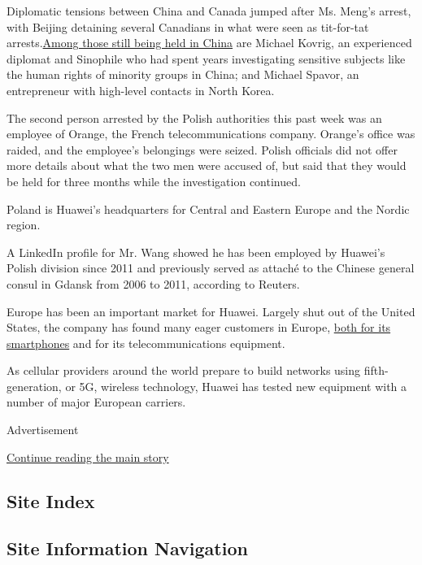 Diplomatic tensions between China and Canada jumped after Ms. Meng's
arrest, with Beijing detaining several Canadians in what were seen as
tit-for-tat
arrests.\href{https://www.nytimes.com/2018/12/14/world/canada/china-detained-spavor-kovrig.html}{Among
those still being held in China} are Michael Kovrig, an experienced
diplomat and Sinophile who had spent years investigating sensitive
subjects like the human rights of minority groups in China; and Michael
Spavor, an entrepreneur with high-level contacts in North Korea.

The second person arrested by the Polish authorities this past week was
an employee of Orange, the French telecommunications company. Orange's
office was raided, and the employee's belongings were seized. Polish
officials did not offer more details about what the two men were accused
of, but said that they would be held for three months while the
investigation continued.

Poland is Huawei's headquarters for Central and Eastern Europe and the
Nordic region.

A LinkedIn profile for Mr. Wang showed he has been employed by Huawei's
Polish division since 2011 and previously served as attaché to the
Chinese general consul in Gdansk from 2006 to 2011, according to
Reuters.

Europe has been an important market for Huawei. Largely shut out of the
United States, the company has found many eager customers in Europe,
\href{https://www.nytimes.com/2019/01/04/technology/china-smartphones-iphone.html?rref=collection\%2Fbyline\%2Fraymond-zhong\&action=click\&contentCollection=undefined\&region=stream\&module=stream_unit\&version=latest\&contentPlacement=3\&pgtype=collection}{both
for its smartphones} and for its telecommunications equipment.

As cellular providers around the world prepare to build networks using
fifth-generation, or 5G, wireless technology, Huawei has tested new
equipment with a number of major European carriers.

Advertisement

\protect\hyperlink{after-bottom}{Continue reading the main story}

\hypertarget{site-index}{%
\subsection{Site Index}\label{site-index}}

\hypertarget{site-information-navigation}{%
\subsection{Site Information
Navigation}\label{site-information-navigation}}

